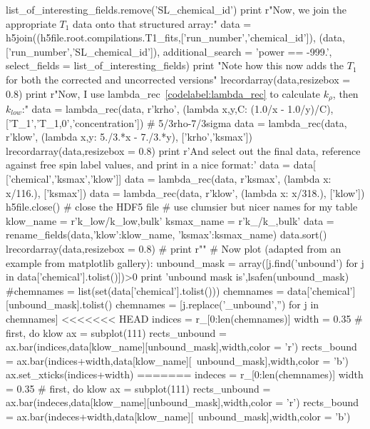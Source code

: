 \begin{python}
list_of_interesting_fields.remove('SL_chemical_id')
print r"Now, we join the appropriate $T_1$ data onto that structured array:"
data = h5join((h5file.root.compilations.T1_fits,['run_number','chemical_id']),
    (data,['run_number','SL_chemical_id']),
    additional_search = 'power == -999.',
    select_fields = list_of_interesting_fields)
print "Note how this now adds the $T_1$ for both the corrected and uncorrected versions"
lrecordarray(data,resizebox = 0.8)
print r"Now, I use lambda\_rec~\ref{codelabel:lambda_rec} to calculate $k_\rho$, then $k_{low}$:"
data = lambda_rec(data,
    r'krho',
    (lambda x,y,C: (1.0/x - 1.0/y)/C),
    ['T_1','T_{1,0}','concentration'])
# 5/3rho-7/3sigma
data = lambda_rec(data,
    r'klow',
    (lambda x,y: 5./3.*x - 7./3.*y),
    ['krho','ksmax'])
lrecordarray(data,resizebox = 0.8)
print r'And select out the final data, reference against free spin label values, and print in a nice format:'
data = data[ ['chemical','ksmax','klow']]
data = lambda_rec(data,
    r'ksmax',
    (lambda x: x/116.),
    ['ksmax'])
data = lambda_rec(data,
    r'klow',
    (lambda x: x/318.),
    ['klow'])
h5file.close() # close the HDF5 file
#{{{ use clumsier but nicer names for my table
klow_name = r'k_{low}/k_{low,bulk}'
ksmax_name = r'k_{\sigma}/k_{\sigma,bulk}'
data = rename_fields(data,{'klow':klow_name,
                            'ksmax':ksmax_name})
data.sort()
lrecordarray(data,resizebox = 0.8)
#}}}
print r"{\color{red}{\bf This particular example is having trouble because of how I'm trying to sort the data $\Rightarrow$ what I used to have only worked when there was just one piece of data per chemical, but since I fixed the code, the repeats are also included}}"
#{{{ Now plot (adapted from an example from matplotlib gallery):
unbound_mask = array([j.find('unbound') for j in data['chemical'].tolist()])>0
print 'unbound mask is',lsafen(unbound_mask)
#chemnames = list(set(data['chemical'].tolist()))
chemnames = data['chemical'][unbound_mask].tolist()
chemnames = [j.replace('_unbound','') for j in chemnames]
<<<<<<< HEAD
indices = r_[0:len(chemnames)]
width = 0.35
#{{{ first, do klow
ax = subplot(111)
rects_unbound = ax.bar(indices,data[klow_name][unbound_mask],width,color = 'r')
rects_bound = ax.bar(indices+width,data[klow_name][~unbound_mask],width,color = 'b')
ax.set_xticks(indices+width)
=======
indeces = r_[0:len(chemnames)]
width = 0.35
#{{{ first, do klow
ax = subplot(111)
rects_unbound = ax.bar(indeces,data[klow_name][unbound_mask],width,color = 'r')
rects_bound = ax.bar(indeces+width,data[klow_name][~unbound_mask],width,color = 'b')
}}}}}}}}}
\end{python}

